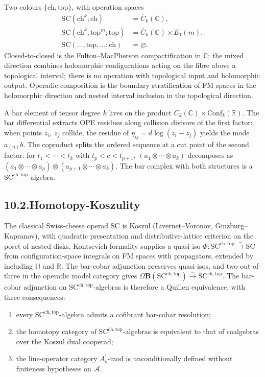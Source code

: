 \documentclass[11pt,reqno]{amsart}
\theoremstyle{definition}
\theoremstyle{remark}
\providecommand{\cA}{\mathcal{A}}
\providecommand{\FM}{\overline{C}}
\providecommand{\bC}{\mathbb{C}}
\providecommand{\bR}{\mathbb{R}}
\providecommand{\SCchtop}{\mathrm{SC}^{\mathrm{ch,top}}}
\providecommand{\Conf}{\mathrm{Conf}}
\providecommand{\SC}{\mathrm{SC}}
\numberwithin{equation}{section}
\begin{document}
Two colours $\{\mathrm{ch}, \mathrm{top}\}$, with operation
spaces
\begin{align*}
\SC(\mathrm{ch}^k; \mathrm{ch}) &= \FM_k(\bC),\\
\SC(\mathrm{ch}^k, \mathrm{top}^m; \mathrm{top})
&= \FM_k(\bC) \times E_1(m),\\
\SC(\ldots, \mathrm{top}, \ldots; \mathrm{ch}) &= \varnothing.
\end{align*}
Closed-to-closed is the Fulton--MacPherson compactification in
$\bC$; the mixed direction combines holomorphic configurations
acting on the fibre above a topological interval; there is no operation
with topological input and holomorphic output. Operadic composition is the boundary stratification
of FM spaces in the holomorphic direction and nested interval
inclusion in the topological direction.

A bar element of tensor degree $k$ lives on the product
$\FM_k(\bC) \times \Conf_k(\bR)$. The bar differential extracts
OPE residues along collision divisors of the first factor: when
points $z_i$, $z_j$ collide, the residue of
$\eta_{ij} = d\log(z_i - z_j)$ yields the mode $a_{(n)}b$. The
coproduct splits the ordered sequence at a cut point of the
second factor: for $t_1 < \cdots < t_k$ with $t_p < c < t_{p+1}$,
$(a_1\otimes\cdots\otimes a_k)$ decomposes as
$(a_1\otimes\cdots\otimes a_p)\otimes(a_{p+1}\otimes\cdots\otimes a_k)$.
The bar complex with both structures is a
$\SCchtop$-algebra.

\subsection*{10.2.\enspace Homotopy-Koszulity}

The classical Swiss-cheese operad $\SC$ is Koszul
(Livernet--Voronov, Ginzburg--Kapranov), with quadratic
presentation and distributive-lattice criterion on the poset
of nested disks. Kontsevich formality supplies a quasi-iso
$\Phi\colon \SCchtop \xrightarrow{\sim} \SC$ from
configuration-space integrals on FM spaces with propagators,
extended by including $\mathbb H$ and $\bR$. The bar-cobar
adjunction preserves quasi-isos, and two-out-of-three in the
operadic model category gives
$\Omega\mathbf B(\SCchtop) \xrightarrow{\sim} \SCchtop$. The
bar-cobar adjunction on $\SCchtop$-algebras is therefore a
Quillen equivalence, with three consequences:
\begin{enumerate}[label=(\roman*),nosep]
\item every $\SCchtop$-algebra admits a cofibrant bar-cobar
resolution;
\item the homotopy category of $\SCchtop$-algebras is
equivalent to that of coalgebras over the Koszul dual
cooperad;
\item the line-operator category $A_b^!\text{-mod}$ is
unconditionally defined without finiteness hypotheses on $\cA$.
\end{enumerate}
\end{document}
